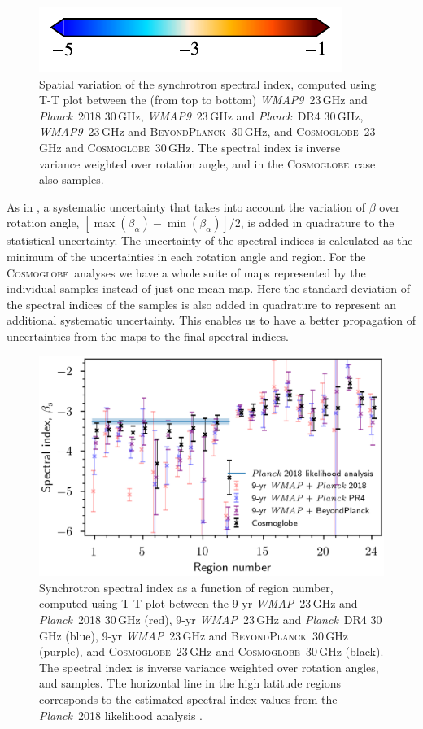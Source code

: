 \documentclass[twocolumn]{../../common/aa}
\def\WMAP{\emph{WMAP}}
\def\WMAPnine{\emph{WMAP9}}
\def\Planck{\emph{Planck}}
\newcommand{\BP}{\textsc{BeyondPlanck}}
\newcommand{\Cosmoglobe}{\textsc{Cosmoglobe}}
\begin{document}
\begin{figure}
	\hspace{0.25cm}\includegraphics{figures/cbar_beta_wide.pdf}
	\caption{Spatial variation of the synchrotron spectral index, computed using T-T plot between the (from top to bottom) \WMAPnine\ 23\,GHz and \Planck\ 2018 30\,GHz, \WMAPnine\ 23\,GHz and \Planck\ DR4 30\,GHz, \WMAPnine\ 23\,GHz and \BP\ 30\,GHz, and \Cosmoglobe\ 23\,GHz and \Cosmoglobe\ 30\,GHz. The spectral index is inverse variance weighted over rotation angle, and in the \Cosmoglobe\ case also samples.}
        \label{fig:TT_beta_maps}
\end{figure}

As in \citet{fuskeland:2019}, a systematic uncertainty that takes into account the variation of $\beta$ over rotation angle, $[ \max(\beta_\alpha) - \min(\beta_\alpha) ] /2$, is added in quadrature to the statistical uncertainty.
The uncertainty of the spectral indices is calculated as the minimum of the uncertainties in each rotation angle and region. 
For the \Cosmoglobe\ analyses we have a whole suite of maps represented by the individual samples instead of just one mean map. Here the standard deviation of the spectral indices of the samples is also added in quadrature to represent an additional systematic uncertainty. This enables us to have a better propagation of uncertainties from the maps to the final spectral indices.

\begin{figure}
        \centering
        \includegraphics[width=\linewidth]{figures/cos30_region_beta_cosmoglobe_vs_wmap_all.png}
        \caption{Synchrotron spectral index as a function of region number, computed using T-T plot between the 9-yr \WMAP\ 23\,GHz and \Planck\ 2018 30\,GHz (red), 9-yr \WMAP\ 23\,GHz and \Planck\ DR4 30\,GHz (blue), 9-yr \WMAP\ 23\,GHz and \BP\ 30\,GHz (purple), and \Cosmoglobe\ 23\,GHz and \Cosmoglobe\ 30\,GHz (black). The spectral index is inverse variance weighted over rotation angles, and samples. The horizontal line in the high latitude regions corresponds to the estimated spectral index values from the \Planck\ 2018 likelihood analysis \citep{planck2016-l05}. }
        \label{fig:cos30_beta_region}
\end{figure}
\end{document}
